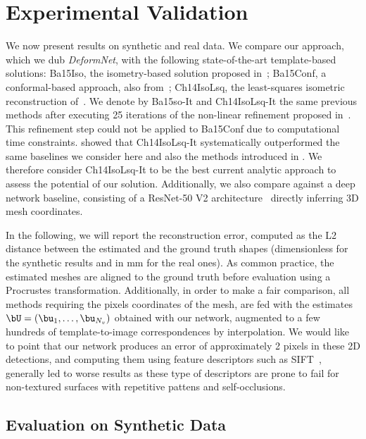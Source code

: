 \documentclass[10pt,twocolumn,letterpaper]{article}
\begin{document}
\section{Experimental Validation}  
We now present results on synthetic and real data. 
We compare our approach, which we dub \emph{DeformNet}, with the following state-of-the-art template-based solutions: Ba15Iso, the isometry-based solution proposed in~\cite{bartoli2015shape}; Ba15Conf, a conformal-based  approach, also from~\cite{bartoli2015shape}; Ch14IsoLsq, the least-squares isometric reconstruction of~\cite{chhatkuli2014stable}. We denote by Ba15so-It and Ch14IsoLsq-It the same previous methods after executing 25 iterations of the non-linear refinement proposed in~\cite{brunet2010monocular}. This refinement step could not be applied to Ba15Conf due to computational time constraints. \cite{chhatkuli2014stable} showed that Ch14IsoLsq-It systematically outperformed the same baselines we consider here and also the methods introduced in \cite{brunet2010monocular,perriollat2011monocular,salzmann2009reconstructing}. We therefore consider Ch14IsoLsq-It to be the best current analytic approach to assess the potential of our solution. Additionally, we also compare against a deep network baseline, consisting of a ResNet-50 V2 architecture~\cite{he2016identity} directly inferring 3D mesh coordinates. 


In the following, we will report the reconstruction error, computed as the L2 distance between the estimated and the ground truth shapes (dimensionless for the synthetic results and in mm for the real ones). As common practice, the estimated meshes are aligned to the ground truth before evaluation using a Procrustes transformation. Additionally, in order to make a fair comparison, all methods requiring the pixels coordinates of the mesh, are fed with the estimates $\bU=(\bu_1,\ldots,\bu_{N_v})$ obtained with our network, augmented to a few hundreds of template-to-image correspondences by  interpolation. We would like to point that our network produces an error of approximately 2 pixels in these 2D detections, and computing them using feature descriptors such as SIFT~\cite{LoweIJCV2004}, generally led to worse results as these type of descriptors are prone to fail for non-textured surfaces with repetitive pattens and self-occlusions. 


\subsection{Evaluation on Synthetic Data}
\end{document}
